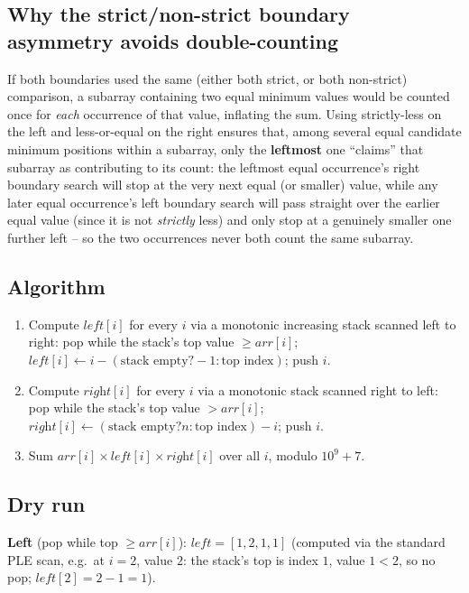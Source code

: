 \subsection*{Why the strict/non-strict boundary asymmetry avoids double-counting}

If both boundaries used the same (either both strict, or both
non-strict) comparison, a subarray containing two equal minimum values
would be counted once for \emph{each} occurrence of that value, inflating
the sum. Using strictly-less on the left and less-or-equal on the right
ensures that, among several equal candidate minimum positions within a
subarray, only the \textbf{leftmost} one ``claims'' that subarray as
contributing to its count: the leftmost equal occurrence's right boundary
search will stop at the very next equal (or smaller) value, while any
later equal occurrence's left boundary search will pass straight over
the earlier equal value (since it is not \emph{strictly} less) and only
stop at a genuinely smaller one further left -- so the two occurrences
never both count the same subarray.

\subsection*{Algorithm}

\begin{enumerate}
  \item Compute $\textit{left}[i]$ for every $i$ via a monotonic
        increasing stack scanned left to right: pop while the stack's top
        value $\ge \textit{arr}[i]$; $\textit{left}[i] \gets i - (\text{
        stack empty} ? -1 : \text{top index})$; push $i$.
  \item Compute $\textit{right}[i]$ for every $i$ via a monotonic stack
        scanned right to left: pop while the stack's top value $>
        \textit{arr}[i]$; $\textit{right}[i] \gets (\text{stack empty} ?
        n : \text{top index}) - i$; push $i$.
  \item Sum $\textit{arr}[i] \times \textit{left}[i] \times
        \textit{right}[i]$ over all $i$, modulo $10^9+7$.
\end{enumerate}

\subsection*{Dry run}


\textbf{Left} (pop while top $\ge \textit{arr}[i]$): $\textit{left} =
[1,2,1,1]$ (computed via the standard PLE scan, e.g.\ at $i=2$, value
$2$: the stack's top is index $1$, value $1 < 2$, so no pop;
$\textit{left}[2]=2-1=1$).

